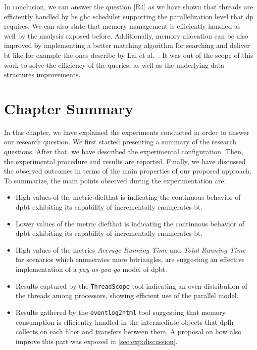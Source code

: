 In conclusion, we can answer the question [R4] as we have shown that threads are efficiently handled by \acrshort{hs} \acrshort{ghc} scheduler supporting the parallelization level that \acrshort{dp} requires. 
We can also state that memory management is efficiently handled as well by the analysis exposed before.
Additionally, memory allocation can be also improved by implementing a better matching algorithm for searching and deliver \acrshort{bt} like for example the ones describe by Lai et al.~\cite{Lai}. 
It was out of the scope of this work to solve the efficiency of the queries, as well as the underlying data structures improvements. 


\section{Chapter Summary}
In this chapter, we have explained the experiments conducted in order to answer our research question.
We first started presenting a summary of the research questions. After that, we have described the experimental configuration.
Then, the experimental procedure and results are reported. Finally, we have discussed the observed outcomes in terms of the main properties of our proposed approach.
To summarize, the main points observed during the experimentation are:
\begin{itemize}
  \item High values of the metric dief\@t that is indicating the continuous behavior of \acrshort{dpbt} exhibiting its capability of incrementally enumerates \acrshort{bt}.
  \item Lower values of the metric dief\@k that is indicating the continuous behavior of \acrshort{dpbt} exhibiting its capability of incrementally enumerates \acrshort{bt}.
  \item High values of the metrics \emph{Average Running Time} and \emph{Total Running Time} for scenarios which enumerates more bitriangles, are suggesting an effective implementation of a \emph{pay-as-you-go} model of \acrshort{dpbt}.
  \item Results captured by the \texttt{ThreadScope} tool indicating an even distribution of the threads among processors, showing efficient use of the parallel model.
  \item Results gathered by the \texttt{eventlog2html} tool suggesting that memory consumption is efficiently handled in the intermediate objects that \acrshort{dpfh} collects on each filter and transfers between them. A proposal on how also improve this part was exposed in \autoref{sec:exp:discussion}.
\end{itemize} 
